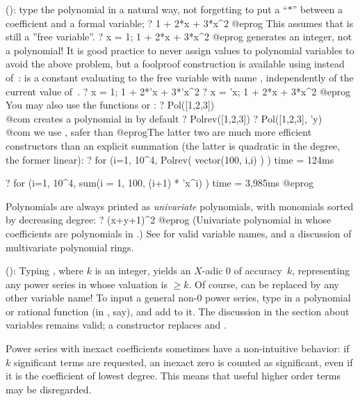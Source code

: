 \label{se:pol}
(): type the polynomial in a natural way, not
forgetting to put a ``$*$'' between a coefficient and a formal variable;
\bprog
? 1 + 2*x + 3*x^2
@eprog\noindent
This assumes that  is still a ''free variable''.
\bprog
? x = 1; 1 + 2*x + 3*x^2
@eprog\noindent
generates an integer, not a polynomial! It is good practice to never assign
values to polynomial variables to avoid the above problem, but a foolproof
construction is available using  instead of~: 
is a constant evaluating to the free variable with name ,
independently of the current value of~.
\bprog
? x = 1; 1 + 2*'x + 3*'x^2
? x = 'x; 1 + 2*x + 3*x^2
@eprog\noindent
You may also use the functions  or :
\bprog
? Pol([1,2,3])         \\@com {} creates a polynomial in  by default
? Polrev([1,2,3])
? Pol([1,2,3], 'y)     \\@com we use , safer than 
@eprog\noindent The latter two are much more efficient constructors than an
explicit summation (the latter is quadratic in the degree, the former linear):
\bprog
? for (i=1, 10^4, Polrev( vector(100, i,i) ) )
time = 124ms

? for (i=1, 10^4, sum(i = 1, 100, (i+1) * 'x^i) )
time = 3,985ms
@eprog

Polynomials are always printed as \emph{univariate} polynomials, with
monomials sorted by decreasing degree:
\bprog
? (x+y+1)^2
@eprog\noindent
(Univariate polynomial in  whose coefficients are polynomials in
.) See  for valid variable names, and a discussion
of multivariate polynomial rings.

\label{se:series}
():
Typing , where $k$ is an integer, yields an $X$-adic $0$ of
accuracy~$k$, representing any power series in  whose valuation is
$\geq k$. Of course,  can be replaced by any other variable name! To
input a general non-0 power series, type in a polynomial or rational
function (in , say), and add  to it. The discussion
in the  section about variables remains valid; a constructor
 replaces  and .

 Power series with inexact coefficients sometimes have a
non-intuitive behavior: if $k$ significant terms are requested, an inexact
zero is counted as significant, even if it is the coefficient of lowest
degree. This means that useful higher order terms may be disregarded.

